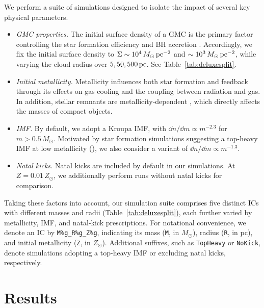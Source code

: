 \documentclass[twocolumn]{aastex631}
\begin{document}
We perform a suite of simulations designed to isolate the impact of several key physical parameters.

\begin{itemize}
\item \emph{GMC properties.} The initial surface density of a GMC is the primary factor controlling the star formation efficiency and BH accretion \citep[e.g.,][]{GrudicGuszejnovHopkins_2018MNRAS.481..688G,ShiKremerGrudic_2023MNRAS.518.3606S}. Accordingly, we fix the initial surface density to $\Sigma \sim 10^4\,M_\odot\,{\rm pc}^{-2}$ and $\sim 10^3\,M_\odot\,{\rm pc}^{-2}$, while varying the cloud radius over ${5,50,500}\,\rm pc$. See Table~\ref{tab:deluxesplit}.

\item \emph{Initial metallicity.} Metallicity influences both star formation and feedback through its effects on gas cooling and the coupling between radiation and gas. In addition, stellar remnants are metallicity-dependent \citep{CostaShepherdBressan_2025A&A...694A.193C}, which directly affects the masses of compact objects.

\item \emph{IMF.} By default, we adopt a Kroupa IMF, with $\dd n/\dd m \propto m^{-2.3}$ for $m>0.5\,M_\odot$. Motivated by star formation simulations suggesting a top-heavy IMF at low metallicity (\citealt{ChonOmukaiSchneider_2021MNRAS.508.4175C}), we also consider a variant of $\dd n/\dd m \propto m^{-1.3}$. 

\item \emph{Natal kicks.} Natal kicks are included by default in our simulations. At $Z=0.01\,Z_\odot$, we additionally perform runs without natal kicks for comparison.
\end{itemize}

Taking these factors into account, our simulation suite comprises five distinct ICs with different masses and radii (Table~\ref{tab:deluxesplit}), each further varied by metallicity, IMF, and natal-kick prescriptions. For notational convenience, we denote an IC by \texttt{M\%g\_R\%g\_Z\%g}, indicating its mass (\texttt{M}, in $M_\odot$), radius (\texttt{R}, in pc), and initial metallicity (\texttt{Z}, in $Z_\odot$). Additional suffixes, such as \texttt{TopHeavy} or \texttt{NoKick}, denote simulations adopting a top-heavy IMF or excluding natal kicks, respectively.


\section{Results}
\label{sec:results}
\end{document}
